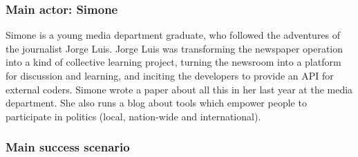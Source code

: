\subsubsection{Main actor: Simone}

Simone is a young media department graduate, who followed the adventures
of the journalist Jorge Luis. Jorge Luis was transforming the newspaper
operation into a kind of collective learning project, turning the
newsroom into a platform for discussion and learning, and inciting the
developers to provide an API for external coders. Simone wrote a paper
about all this in her last year at the media department. She
also runs a blog about tools which empower people to participate in
politics (local, nation-wide and international).

\subsubsection{Main success scenario}

